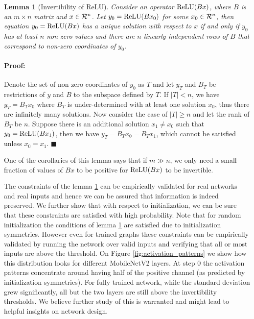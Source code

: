 \documentclass[10pt,twocolumn,letterpaper]{article}
\def\real{{\cal R}}
\newenvironment{proof}{\paragraph{Proof:}}{$\blacksquare$}
\DeclareMathOperator{\reluop}{ReLU}
\def\relu{\ensuremath \reluop}
\newtheorem{lemma}{Lemma}
\begin{document}
\def\E{\mathbb{E}}
\begin{lemma}[Invertibility of ReLU]
\label{thm:invertibility-of-relu}
Consider an operator $\relu (B x)$, where $B$ is an $m \times n$ matrix and $x \in \real^n$. Let $y_0 = \relu (B x_0)$ for some $x_0\in \real^n$, then equation $y_0=\relu (B x)$ has a unique solution with respect to $x$ if and only if $y_0$ has at least $n$ non-zero values and there are $n$ linearly independent rows of $B$ that correspond to non-zero coordinates of $y_0$.
\end{lemma}
\begin{proof}
    Denote the set of non-zero coordinates of $y_0$ as $T$ and let $y_T$ and $B_T$ be restrictions of $y$ and $B$ to the subspace defined by $T$.
    If $|T| < n$, we have $y_T = B_T x_0$ where $B_T$ is under-determined with at least one solution $x_0$, thus there are infinitely many solutions. 
    Now consider the case of $|T| \ge n$ and let the rank of $B_T$ be $n$. Suppose there is an additional solution $x_1 \ne x_0$ such that $y_0=\relu (B x_1)$, then we have $y_T = B_T x_0 = B_T x_1$, which cannot be satisfied unless $x_0 = x_1$.
\end{proof}

One of the corollaries of this lemma says that if $m \gg n$, we only need a small fraction of values of $Bx$ to be positive for $\relu (B x)$ to be invertible.

The constraints of the lemma \ref{thm:invertibility-of-relu} can be empirically validated for real networks and real inputs and hence we can be assured that information is indeed preserved. We further show that with respect to initialization, we can be sure that these constraints are satisfied with high probability. Note that for random initialization the conditions of
lemma \ref{thm:invertibility-of-relu} are satisfied due
to initialization symmetries. However even for trained graphs these constraints can be empirically validated by running
the network over valid inputs and verifying that all or most inputs are above the threshold. On Figure \ref{fig:activation_patterns} we show how this distribution looks for  different MobileNetV2 layers. At step $0$ the activation patterns concentrate around having half of the positive channel (as predicted by initialization symmetries). For fully trained network, while the standard deviation grew significantly, all but the two layers are still above the invertibility thresholds. We believe further study of this is warranted and might lead to helpful insights on network design.
\end{document}

